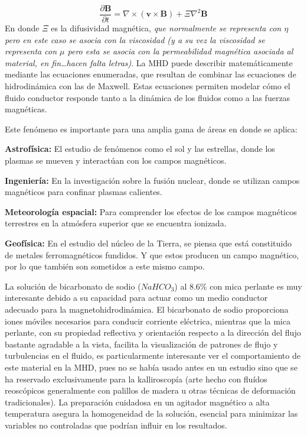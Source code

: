 \documentclass[article,12pt]{elsarticle}
\begin{document}
    \begin{equation}
        \frac{\partial \mathbf{B}}{\partial t} = \nabla \times (\mathbf{v} \times \mathbf{B}) + \Xi \nabla^2 \mathbf{B}
    \end{equation}
    En donde $\Xi$ es la difusividad magnética, \textit{que normalmente se representa con $\eta$ pero en este caso se asocia con la viscosidad (y a su vez la viscosidad se representa con $\mu$ pero esta se asocia con la permeabilidad magnética asociada al material, en fin\dots hacen falta letras)}. La MHD puede describir matemáticamente mediante las ecuaciones enumeradas, que resultan de combinar las ecuaciones de hidrodinámica con las de Maxwell. Estas ecuaciones permiten modelar cómo el fluido conductor responde tanto a la dinámica de los fluidos como a las fuerzas magnéticas.
    
     Este fenómeno es importante para una amplia gama de áreas en donde se aplica:
    
    \textbf{Astrofísica:} El estudio de fenómenos como el sol y las estrellas, donde los plasmas se mueven y interactúan con los campos magnéticos.
    
    \textbf{Ingeniería:} En la investigación sobre la fusión nuclear, donde se utilizan campos magnéticos para confinar plasmas calientes.
    
    \textbf{Meteorología espacial:} Para comprender los efectos de los campos magnéticos terrestres en la atmósfera superior que se encuentra ionizada.

    \textbf{Geofísica:} En el estudio del núcleo de la Tierra, se piensa que está constituido de metales ferromagnéticos fundidos. Y que estos producen un campo magnético, por lo que también son sometidos a este mismo campo.
    
    La solución de bicarbonato de sodio ($NaHCO_3$) al 8.6\% con mica perlante es muy interesante debido a su capacidad para actuar como un medio conductor adecuado para la magnetohidrodinámica. El bicarbonato de sodio proporciona iones móviles necesarios para conducir corriente eléctrica, mientras que la mica perlante, con su propiedad reflectiva y orientación respecto a la dirección del flujo bastante agradable a la vista, facilita la visualización de patrones de flujo y turbulencias en el fluido, es particularmente interesante ver el comportamiento de este material en la MHD, pues no se había usado antes en un estudio sino que se ha reservado exclusivamente para la kalliroscopía (arte hecho con fluídos reoscópicos generalmente con palillos de madera u otras técnicas de deformación tradicionales). La preparación cuidadosa en un agitador magnético a alta temperatura asegura la homogeneidad de la solución, esencial para minimizar las variables no controladas que podrían influir en los resultados.
\end{document}
